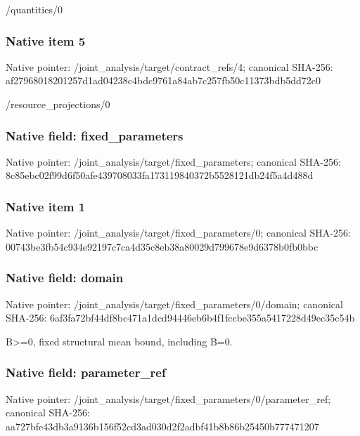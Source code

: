 \documentclass[10pt,a4paper]{article}
\begin{document}
\begingroup\raggedright\sloppy /\allowbreak{}quantities/\allowbreak{}0\par\endgroup

\subsubsection{Native item 5}
Native pointer: /joint\_\allowbreak{}analysis/target/contract\_\allowbreak{}refs/4; canonical SHA-256: af27968018201257d1ad04238c4bdc9761a84ab7c257fb50c11373bdb5dd72c0

\begingroup\raggedright\sloppy /\allowbreak{}resource\_\allowbreak{}projections/\allowbreak{}0\par\endgroup

\subsubsection{Native field: fixed\_\allowbreak{}parameters}
Native pointer: /joint\_\allowbreak{}analysis/target/fixed\_\allowbreak{}parameters; canonical SHA-256: 8c85ebc02f99d6f50afe439708033fa173119840372b5528121db24f5a4d488d

\subsubsection{Native item 1}
Native pointer: /joint\_\allowbreak{}analysis/target/fixed\_\allowbreak{}parameters/0; canonical SHA-256: 00743be3fb54c934e92197c7ca4d35c8eb38a80029d799678e9d6378b0fb0bbc

\subsubsection{Native field: domain}
Native pointer: /joint\_\allowbreak{}analysis/target/fixed\_\allowbreak{}parameters/0/domain; canonical SHA-256: 6af3fa72bf44df8bc471a1dcd94446eb6b4f1fccbe355a5417228d49ec35c54b

\begingroup\raggedright\sloppy B>=\allowbreak{}0,\allowbreak{} fixed structural mean bound,\allowbreak{} including B=\allowbreak{}0.\par\endgroup

\subsubsection{Native field: parameter\_\allowbreak{}ref}
Native pointer: /joint\_\allowbreak{}analysis/target/fixed\_\allowbreak{}parameters/0/parameter\_\allowbreak{}ref; canonical SHA-256: aa727bfe43db3a9136b156f52cd3ad030d2f2adbf41b8b86b25450b777471207
\end{document}
